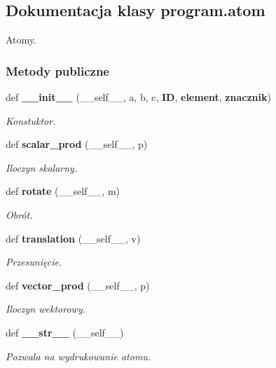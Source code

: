 \subsection{Dokumentacja klasy program.\+atom}
\label{classprogram_1_1atom}


Atomy.  


\subsubsection*{Metody publiczne}
\begin{DoxyCompactItemize}
\item 
def \textbf{ \+\_\+\+\_\+init\+\_\+\+\_\+} (\+\_\+\+\_\+self\+\_\+\+\_\+, a, b, c, \textbf{ ID}, \textbf{ element}, \textbf{ znacznik})
\begin{DoxyCompactList}\small\item\em Konstuktor. \end{DoxyCompactList}\item 
def \textbf{ scalar\+\_\+prod} (\+\_\+\+\_\+self\+\_\+\+\_\+, p)
\begin{DoxyCompactList}\small\item\em Iloczyn skalarny. \end{DoxyCompactList}\item 
def \textbf{ rotate} (\+\_\+\+\_\+self\+\_\+\+\_\+, m)
\begin{DoxyCompactList}\small\item\em Obrót. \end{DoxyCompactList}\item 
def \textbf{ translation} (\+\_\+\+\_\+self\+\_\+\+\_\+, v)
\begin{DoxyCompactList}\small\item\em Przesunięcie. \end{DoxyCompactList}\item 
def \textbf{ vector\+\_\+prod} (\+\_\+\+\_\+self\+\_\+\+\_\+, p)
\begin{DoxyCompactList}\small\item\em Iloczyn wektorowy. \end{DoxyCompactList}\item 
def \textbf{ \+\_\+\+\_\+str\+\_\+\+\_\+} (\+\_\+\+\_\+self\+\_\+\+\_\+)
\begin{DoxyCompactList}\small\item\em Pozwala na wydrukowanie atomu. \end{DoxyCompactList}\end{DoxyCompactItemize}
